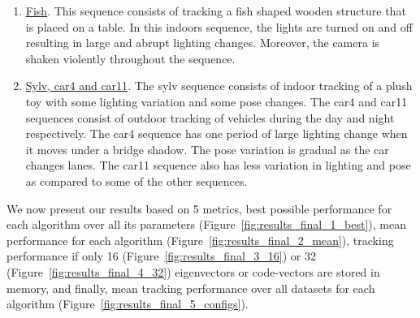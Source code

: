 \begin{enumerate}
\item  \underline{Fish}.  This sequence consists of tracking a fish shaped wooden structure that is placed on a table.  In this indoors sequence, the lights are turned on and off resulting in large and abrupt lighting changes.  Moreover, the camera is shaken violently throughout the sequence.

\item  \underline{Sylv, car4 and car11}.  The sylv sequence consists of indoor tracking of a plush toy with some lighting variation and some pose changes.  The car4 and car11 sequences consist of outdoor tracking of vehicles during the day and night respectively.  The car4 sequence has one period of large lighting change when it moves under a bridge shadow.  The pose variation is gradual as the car changes lanes.  The car11 sequence also has less variation in lighting and pose as compared to some of the other sequences.
\end{enumerate}



We now present our results based on 5 metrics, best possible performance for each algorithm over all its parameters (Figure~\ref{fig:results_final_1_best}), mean performance for each algorithm (Figure~\ref{fig:results_final_2_mean}), tracking performance if only 16 (Figure~\ref{fig:results_final_3_16}) or 32 (Figure~\ref{fig:results_final_4_32}) eigenvectors or code-vectors are stored in memory, and finally, mean tracking performance over all datasets for each algorithm (Figure~\ref{fig:results_final_5_configs}). 


